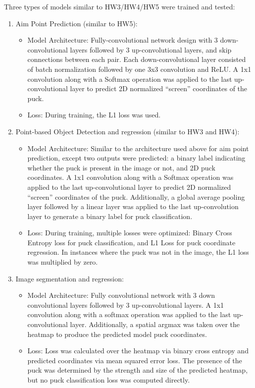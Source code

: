 \documentclass[11pt,a4paper]{article}
\begin{document}
Three types of models similar to HW3/HW4/HW5 were trained and tested:
\begin{enumerate}

\item Aim Point Prediction (similar to HW5):
\begin{itemize}
    \item Model Architecture: Fully-convolutional network design with 3 down-convolutional layers followed by 3 up-convolutional layers, and skip connections between each pair. Each down-convolutional layer consisted of batch normalization followed by one 3x3 convolution and ReLU. A 1x1 convolution along with a Softmax operation was applied to the last up-convolutional layer to predict 2D normalized “screen” coordinates of the puck.
    
    \item Loss: During training, the L1 loss was used.
\end{itemize}




\item Point-based Object Detection and regression (similar to HW3 and HW4):

\begin{itemize}
    \item Model Architecture: Similar to the architecture used above for aim point prediction, except two outputs were predicted: a binary label indicating whether the puck is present in the image or not, and 2D puck coordinates. A 1x1 convolution along with a Softmax operation was applied to the last up-convolutional layer to predict 2D normalized “screen” coordinates of the puck. Additionally, a global average pooling layer followed by a linear layer was applied to the last up-convolution layer to generate a binary label for puck classification.
    \item Loss: During training, multiple losses were optimized: Binary Cross Entropy loss for puck classification, and L1 Loss for puck coordinate regression. In instances where the puck was not in the image, the L1 loss was multiplied by zero.
\end{itemize}


\item Image segmentation and regression:

\begin{itemize}
    \item Model Architecture: Fully convolutional network with 3 down convolutional layers followed by 3 up-convolutional layers. A 1x1 convolution along with a softmax operation was applied to the last up-convolutional layer. Additionally, a spatial argmax was taken over the heatmap to produce the predicted model puck coordinates. 
    \item Loss: Loss was calculated over the heatmap via binary cross entropy and predicted coordinates via mean squared error loss. The presence of the puck was determined by the strength and size of the predicted heatmap, but no puck classification loss was computed directly.
\end{itemize}

\end{enumerate}
\end{document}
